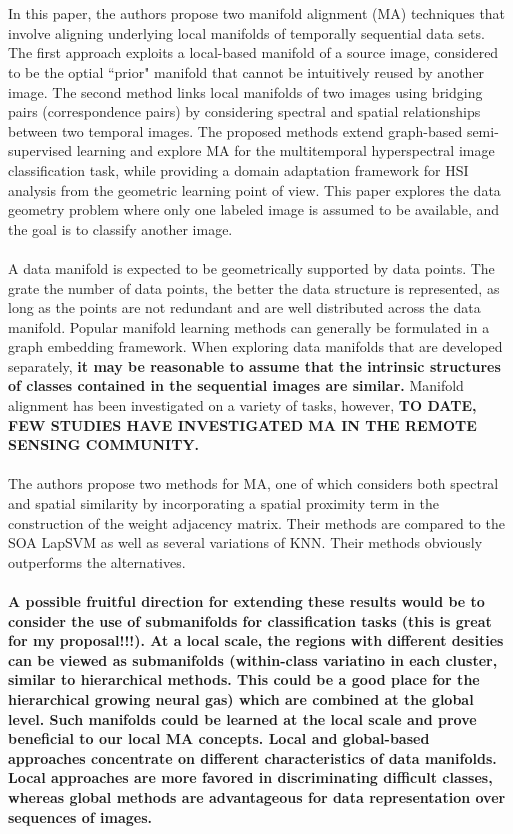 \documentclass[]{article}
\begin{document}
		\\ \\
		In this paper, the authors propose two manifold alignment (MA) techniques that involve aligning underlying local manifolds of temporally sequential data sets.  The first approach exploits a local-based manifold of a source image, considered to be the optial ``prior" manifold that cannot be intuitively reused by another image.  The second method links local manifolds of two images using bridging pairs (correspondence pairs) by considering spectral and spatial relationships between two temporal images.  The proposed methods extend graph-based semi-supervised learning and explore MA for the multitemporal hyperspectral image classification task, while providing a domain adaptation framework for HSI analysis from the geometric learning point of view.  This paper explores the data geometry problem where only one labeled image is assumed to be available, and the goal is to classify another image.		
		\\ \\
		A data manifold is expected to be geometrically supported by data points.  The grate the number of data points, the better the data structure is represented, as long as the points are not redundant and are well distributed across the data manifold.  Popular manifold learning methods can generally be formulated in a graph embedding framework.  When exploring data manifolds that are developed separately, \textbf{it may be reasonable to assume that the intrinsic structures of classes contained in the sequential images are similar.} Manifold alignment has been investigated on a variety of tasks, however, \textbf{TO DATE, FEW STUDIES HAVE INVESTIGATED MA IN THE REMOTE SENSING COMMUNITY.}
		\\ \\
		The authors propose two methods for MA, one of which considers both spectral and spatial similarity by incorporating a spatial proximity term in the construction of the weight adjacency matrix.  Their methods are compared to the SOA LapSVM as well as several variations of KNN.  Their methods obviously outperforms the alternatives.
		\\ \\
		\textbf{A possible fruitful direction for extending these results would be to consider the use of submanifolds for classification tasks (this is great for my proposal!!!).  At a local scale, the regions with different desities can be viewed as submanifolds (within-class variatino in each cluster, similar to hierarchical methods.  This could be a good place for the hierarchical growing neural gas) which are combined at the global level. Such manifolds could be learned at the local scale and prove beneficial to our local MA concepts.  Local and global-based approaches concentrate on different characteristics of data manifolds.  Local approaches are more  favored in discriminating difficult classes, whereas global methods are advantageous for data representation over sequences of images.} \\
		
\end{document}
